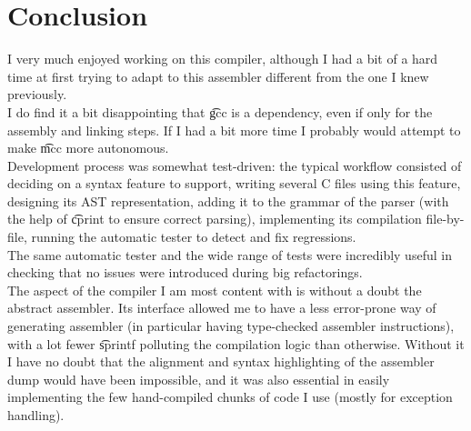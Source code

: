 \section{Conclusion}
I very much enjoyed working on this compiler, although I had a bit of a hard time at first trying to adapt to this assembler different from the one I knew previously.\\
I do find it a bit disappointing that \t{gcc} is a dependency, even if only for the assembly and linking steps. If I had a bit more time I probably would attempt to make \t{mcc} more autonomous.\\

Development process was somewhat test-driven: the typical workflow consisted of deciding on a syntax feature to support, writing several C files using this feature, designing its AST representation, adding it to the grammar of the parser (with the help of \t{cprint} to ensure correct parsing), implementing its compilation file-by-file, running the automatic tester to detect and fix regressions.\\
The same automatic tester and the wide range of tests were incredibly useful in checking that no issues were introduced during big refactorings.\\

The aspect of the compiler I am most content with is without a doubt the abstract assembler. Its interface allowed me to have a less error-prone way of generating assembler (in particular having type-checked assembler instructions), with a lot fewer \t{sprintf} polluting the compilation logic than otherwise. Without it I have no doubt that the alignment and syntax highlighting of the assembler dump would have been impossible, and it was also essential in easily implementing the few hand-compiled chunks of code I use (mostly for exception handling).
